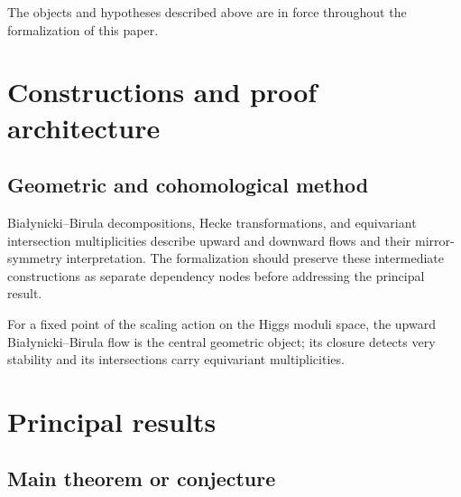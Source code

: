 \begin{convention}
\label{very-stable-higgs-bundles-equivariant-multiplicity-mirror-symmetry-setup}
The objects and hypotheses described above are in force throughout the
formalization of this paper.
\notready
\end{convention}

\chapter{Constructions and proof architecture}
\label{chap:very-stable-higgs-bundles-equivariant-multiplicity-mirror-symmetry-method}

\section{Geometric and cohomological method}
\label{sec:very-stable-higgs-bundles-equivariant-multiplicity-mirror-symmetry-method}

Białynicki--Birula decompositions, Hecke transformations, and equivariant intersection multiplicities describe upward and downward flows and their mirror-symmetry interpretation. The formalization should preserve these intermediate constructions
as separate dependency nodes before addressing the principal result.

\begin{definition}
\label{very-stable-higgs-bundles-equivariant-multiplicity-mirror-symmetry-central-object}
For a fixed point of the scaling action on the Higgs moduli space, the upward Białynicki--Birula flow is the central geometric object; its closure detects very stability and its intersections carry equivariant multiplicities.
\notready
\end{definition}

\chapter{Principal results}
\label{chap:very-stable-higgs-bundles-equivariant-multiplicity-mirror-symmetry-results}

\section{Main theorem or conjecture}
\label{sec:very-stable-higgs-bundles-equivariant-multiplicity-mirror-symmetry-results}

